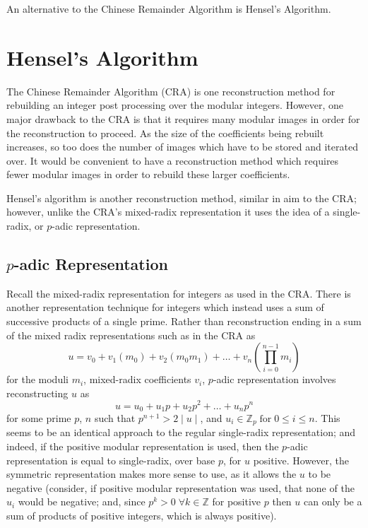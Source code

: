 \documentclass[letterpaper,12pt,titlepage,oneside,final]{book}
\begin{document}
An alternative to the Chinese Remainder Algorithm is Hensel's Algorithm.              

\section{Hensel's Algorithm}

The Chinese Remainder Algorithm (CRA) is one reconstruction method for rebuilding an integer post processing over the modular integers.  However, one major drawback to the CRA is that it requires many modular images in order for the reconstruction to proceed.  As the size of the coefficients being rebuilt increases, so too does the number of images which have to be stored and iterated over.  It would be convenient to have a reconstruction method which requires fewer modular images in order to rebuild these larger coefficients.   

Hensel's algorithm is another reconstruction method, similar in aim to the CRA; however, unlike the CRA's mixed-radix representation it uses the idea of a single-radix, or ${p}$-adic representation.

\subsection{${p}$-adic Representation}

Recall the mixed-radix representation for integers as used in the CRA.  There is another representation technique for integers which instead uses a sum of successive products of a single prime.  Rather than reconstruction ending in a sum of the mixed radix representations such as in the CRA as
\begin{equation*}
  u = v_0 + v_1(m_0) + v_2(m_0m_1) + \ldots + v_n(\prod_{i=0}^{n-1}m_i)
\end{equation*}
for the moduli ${m_i}$, mixed-radix coefficients ${v_i}$, ${p}$-adic representation involves reconstructing ${u}$ as 
\begin{equation*}
  u = u_0 + u_1p + u_2p^2 + \ldots + u_np^n
\end{equation*}
for some prime ${p}$, ${n}$ such that ${p^{n+1} > 2 \mid u \mid}$, and ${u_i \in \mathbb{Z}_p \; \textrm{for}\; 0 \leq i \leq n}$.  This seems to be an identical approach to the regular single-radix representation; and indeed, if the positive modular representation is used, then the ${p}$-adic representation is equal to single-radix, over base ${p}$, for ${u}$ positive.  However, the symmetric representation makes more sense to use, as it allows the ${u}$ to be negative (consider, if positive modular representation was used, that none of the ${u_i}$ would be negative; and, since ${p^k > 0 \; \forall k \in \mathbb{Z}}$ for positive ${p}$ then ${u}$ can only be a sum of products of positive integers, which is always positive).  
\end{document}
